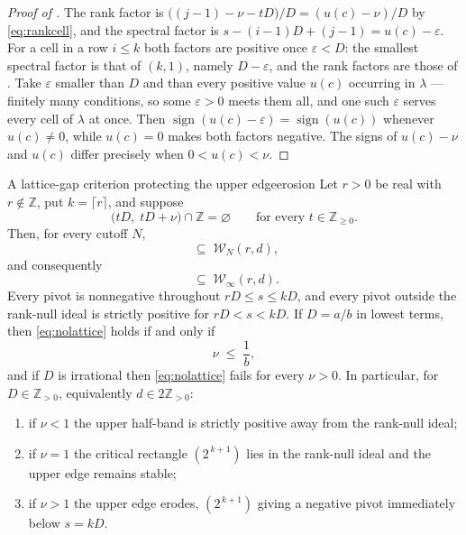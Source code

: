 \documentclass[11pt,letterpaper]{article}
\newcommand{\Zint}{\mathbb{Z}}
\begin{document}
\begin{proof}[Proof of ]
The rank factor is $\bigl((j-1)-\nu-tD\bigr)/D=(u(c)-\nu)/D$ by
\eqref{eq:rankcell}, and the spectral factor is
$s-(i-1)D+(j-1)=u(c)-\varepsilon$. For a cell in a row $i\le k$ both factors are
positive once $\varepsilon<D$: the smallest spectral factor is that of $(k,1)$,
namely $D-\varepsilon$, and the rank factors are those of . Take
$\varepsilon$ smaller than $D$ and than every positive value $u(c)$ occurring in
$\lambda$ --- finitely many conditions, so some $\varepsilon>0$ meets them all,
and one such $\varepsilon$ serves every cell of $\lambda$ at once. Then
$\operatorname{sign}(u(c)-\varepsilon)=\operatorname{sign}(u(c))$ whenever
$u(c)\ne0$, while $u(c)=0$ makes both factors negative. The signs of
$u(c)-\nu$ and $u(c)$ differ precisely when $0<u(c)<\nu$.
\end{proof}

\begin{theorem}{A lattice-gap criterion protecting the upper edge}{erosion}
Let $r>0$ be real with $r\notin\Zint$, put $k=\lceil r\rceil$, and suppose
\begin{equation}
  \bigl(tD,\;tD+\nu\bigr)\cap\Zint=\varnothing
  \qquad\text{for every } t\in\Zint_{\ge0}.
  \label{eq:nolattice}
\end{equation}
Then, for every cutoff $N$,
\begin{equation}
  [\,rD,\;kD\,]\;\subseteq\;\mathcal{W}_N(r,d),
  \label{eq:upperband}
\end{equation}
and consequently
\begin{equation}
  [\,rD,\;kD\,]\;\subseteq\;\mathcal{W}_\infty(r,d).
  \label{eq:upperbandinf}
\end{equation}
Every pivot is nonnegative throughout $rD\le s\le kD$, and every pivot outside
the rank-null ideal is strictly positive for $rD<s<kD$. If $D=a/b$ in lowest
terms, then \eqref{eq:nolattice} holds if and only if
\begin{equation}
  \nu\;\le\;\frac1b ,
  \label{eq:nub}
\end{equation}
and if $D$ is irrational then \eqref{eq:nolattice} fails for every $\nu>0$. In
particular, for $D\in\Zint_{>0}$, equivalently $d\in2\Zint_{>0}$:
\begin{enumerate}
\item[(i)] if $\nu<1$ the upper half-band is strictly positive away from the
  rank-null ideal;
\item[(ii)] if $\nu=1$ the critical rectangle $(2^{\,k+1})$ lies in the
  rank-null ideal and the upper edge remains stable;
\item[(iii)] if $\nu>1$ the upper edge erodes, $(2^{\,k+1})$ giving a negative
  pivot immediately below $s=kD$.
\end{enumerate}
\end{theorem}
\end{document}
